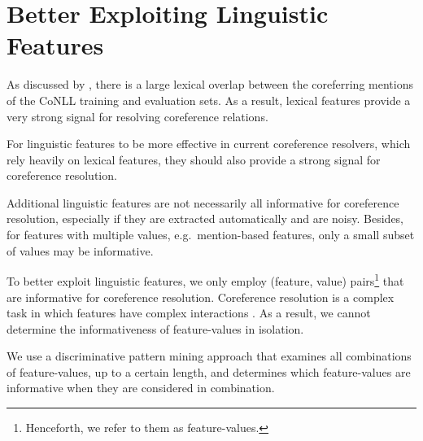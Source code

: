 \section{Better Exploiting Linguistic Features}
\label{ch:improvements:our_app}
As discussed by ,
there is a large lexical overlap between the coreferring mentions
of the CoNLL training and evaluation sets.
As a result, lexical features provide a very strong signal for resolving coreference relations.

For linguistic features to be more effective in current coreference resolvers,
which rely heavily on lexical features,
they should also provide a strong signal for coreference resolution.

Additional linguistic features are not necessarily all informative for coreference resolution, especially if they are extracted automatically and are noisy.
Besides, for features with multiple values, e.g.\ mention-based features, 
only a small subset of values may be informative.

To better exploit linguistic features, 
we only employ (feature, value) pairs\footnote{Henceforth, we refer to them as feature-values.} 
that are informative for coreference resolution.
Coreference resolution is a complex task in which features have complex interactions \cite{recasens09}.
As a result, we cannot determine the informativeness of feature-values in isolation.

We use a discriminative pattern mining approach \cite{cheng07,cheng08,batal10}
that examines all combinations of feature-values, up to a certain length, 
and determines which feature-values are informative when they are considered in combination.

